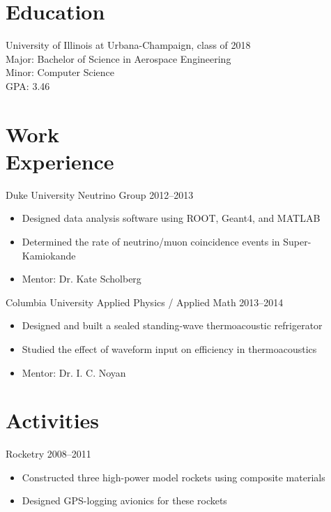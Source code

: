 \documentclass[margin]{res}
\begin{document}
 
\address{remy.goldschmidt@gmail.com \\ \url{http://github.com/taktoa} \\ \url{http://taktoa.me} \\ +1 (914) 703-5652 }

\begin{resume}

\section{Education} 
University of Illinois at Urbana-Champaign, class of 2018 \\
Major: Bachelor of Science in Aerospace Engineering \\
Minor: Computer Science \\
GPA: 3.46

\section{Work \\ Experience}
Duke University Neutrino Group \hfill 2012--2013
  \begin{itemize} \itemsep -2pt
    \item Designed data analysis software using ROOT, Geant4, and MATLAB
    \item Determined the rate of neutrino/muon coincidence events in Super-Kamiokande
    \item Mentor: Dr. Kate Scholberg
  \end{itemize}

Columbia University Applied Physics / Applied Math \hfill 2013--2014
  \begin{itemize} \itemsep -2pt
    \item Designed and built a sealed standing-wave thermoacoustic refrigerator
    \item Studied the effect of waveform input on efficiency in thermoacoustics
    \item Mentor: Dr. I. C. Noyan
  \end{itemize}

\section{Activities}
Rocketry \hfill 2008--2011
  \begin{itemize} \itemsep -2pt
    \item Constructed three high-power model rockets using composite materials
    \item Designed GPS-logging avionics for these rockets
  \end{itemize}


\end{resume}
\end{document}
